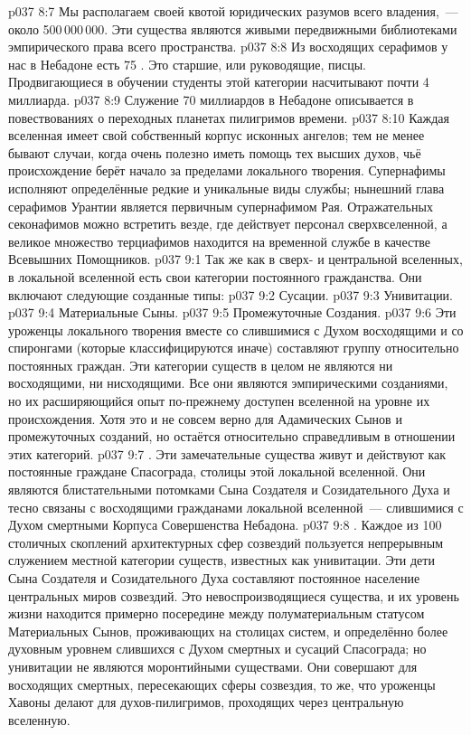 \vs p037 8:7 Мы располагаем своей квотой  юридических разумов всего владения,~--- около 500\,000\,000. Эти существа являются живыми передвижными библиотеками эмпирического права всего пространства.
\vs p037 8:8 Из восходящих серафимов у нас в Небадоне есть 75 . Это старшие, или руководящие, писцы. Продвигающиеся в обучении студенты этой категории насчитывают почти 4 миллиарда.
\vs p037 8:9 Служение 70 миллиардов  в Небадоне описывается в повествованиях о переходных планетах пилигримов времени.
\vs p037 8:10 \pc Каждая вселенная имеет свой собственный корпус исконных ангелов; тем не менее бывают случаи, когда очень полезно иметь помощь тех высших духов, чьё происхождение берёт начало за пределами локального творения. Супернафимы исполняют определённые редкие и уникальные виды службы; нынешний глава серафимов Урантии является первичным супернафимом Рая. Отражательных секонафимов можно встретить везде, где действует персонал сверхвселенной, а великое множество терциафимов находится на временной службе в качестве Всевышних Помощников.
\vs p037 9:1 Так же как в сверх- и центральной вселенных, в локальной вселенной есть свои категории постоянного гражданства. Они включают следующие созданные типы:
\vs p037 9:2 Сусации.
\vs p037 9:3 Унивитации.
\vs p037 9:4 Материальные Сыны.
\vs p037 9:5 Промежуточные Создания.
\vs p037 9:6 \pc Эти уроженцы локального творения вместе со слившимися с Духом восходящими и со спиронгами (которые классифицируются иначе) составляют группу относительно постоянных граждан. Эти категории существ в целом не являются ни восходящими, ни нисходящими. Все они являются эмпирическими созданиями, но их расширяющийся опыт по\hyp{}прежнему доступен вселенной на уровне их происхождения. Хотя это и не совсем верно для Адамических Сынов и промежуточных созданий, но остаётся относительно справедливым в отношении этих категорий.
\vs p037 9:7 \pc {}. Эти замечательные существа живут и действуют как постоянные граждане Спасограда, столицы этой локальной вселенной. Они являются блистательными потомками Сына Создателя и Созидательного Духа и тесно связаны с восходящими гражданами локальной вселенной~--- слившимися с Духом смертными Корпуса Совершенства Небадона.
\vs p037 9:8 \pc {}. Каждое из 100 столичных скоплений архитектурных сфер созвездий пользуется непрерывным служением местной категории существ, известных как унивитации. Эти дети Сына Создателя и Созидательного Духа составляют постоянное население центральных миров созвездий. Это невоспроизводящиеся существа, и их уровень жизни находится примерно посередине между полуматериальным статусом Материальных Сынов, проживающих на столицах систем, и определённо более духовным уровнем слившихся с Духом смертных и сусаций Спасограда; но унивитации не являются моронтийными существами. Они совершают для восходящих смертных, пересекающих сферы созвездия, то же, что уроженцы Хавоны делают для духов\hyp{}пилигримов, проходящих через центральную вселенную.
